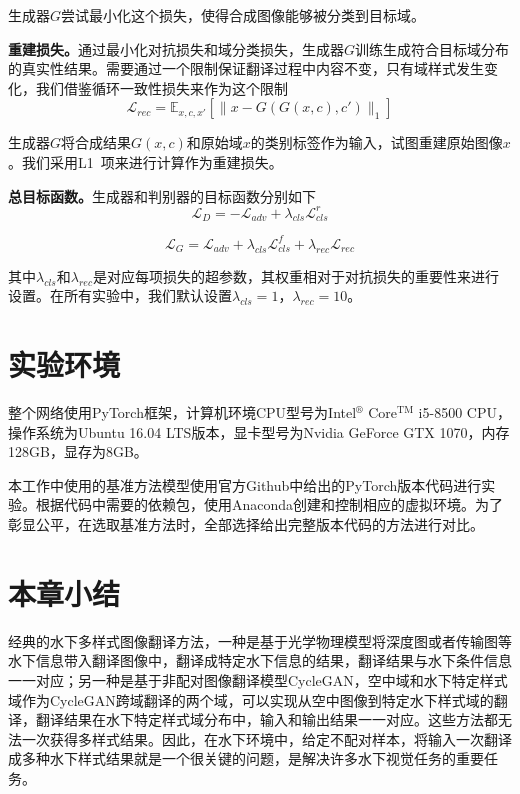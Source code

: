 生成器$G$尝试最小化这个损失，使得合成图像能够被分类到目标域。

\textbf{重建损失。}通过最小化对抗损失和域分类损失，生成器$G$训练生成符合目标域分布的真实性结果。需要通过一个限制保证翻译过程中内容不变，只有域样式发生变化，我们借鉴循环一致性损失来作为这个限制
\begin{equation}
\label{equ:rec_exp2}
\mathcal{L}_{rec} = \mathbb{E}_{x,c,x'}[\| x-G(G(x,c),c') \|_1]
\end{equation}

生成器$G$将合成结果$G(x,c)$和原始域$x$的类别标签作为输入，试图重建原始图像$x$。我们采用L1~\cite{shrivastava2017learning}项来进行计算作为重建损失。

\textbf{总目标函数。}生成器和判别器的目标函数分别如下
\begin{equation}
\label{equ:D_exp2}
\mathcal{L}_{D} = -\mathcal{L}_{adv} + \lambda_{cls}\mathcal{L}_{cls}^{r}
\end{equation}

\begin{equation}
\label{equ:G_exp2}
\mathcal{L}_{G} = \mathcal{L}_{adv}+\lambda_{cls}\mathcal{L}_{cls}^{f}+\lambda_{rec}\mathcal{L}_{rec}
\end{equation}

其中$\lambda_{cls}$和$\lambda_{rec}$是对应每项损失的超参数，其权重相对于对抗损失的重要性来进行设置。在所有实验中，我们默认设置$\lambda_{cls}=1$，$\lambda_{rec}=10$。


\section{实验环境}
整个网络使用PyTorch框架，计算机环境CPU型号为Intel$^\circledR$ Core$^{\text{TM}}$ i5-8500 CPU，操作系统为Ubuntu 16.04 LTS版本，显卡型号为Nvidia GeForce GTX 1070，内存128GB，显存为8GB。

本工作中使用的基准方法模型使用官方Github中给出的PyTorch版本代码进行实验。根据代码中需要的依赖包，使用Anaconda创建和控制相应的虚拟环境。为了彰显公平，在选取基准方法时，全部选择给出完整版本代码的方法进行对比。

\section{本章小结}
经典的水下多样式图像翻译方法，一种是基于光学物理模型将深度图或者传输图等水下信息带入翻译图像中，翻译成特定水下信息的结果，翻译结果与水下条件信息一一对应；另一种是基于非配对图像翻译模型CycleGAN，空中域和水下特定样式域作为CycleGAN跨域翻译的两个域，可以实现从空中图像到特定水下样式域的翻译，翻译结果在水下特定样式域分布中，输入和输出结果一一对应。这些方法都无法一次获得多样式结果。因此，在水下环境中，给定不配对样本，将输入一次翻译成多种水下样式结果就是一个很关键的问题，是解决许多水下视觉任务的重要任务。

